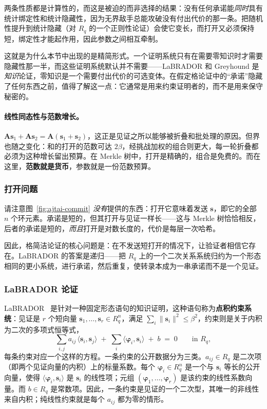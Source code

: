 两条性质都是计算性的，而这是被迫的而非选择的结果：没有任何承诺能\emph{同时}具有统计绑定性和统计隐藏性，因为无界敌手总能攻破没有付出代价的那一条。把随机性提升到统计隐藏（对 $R_q$ 的一个正则性论证）会使它变长，而打开又必须保持短，绑定性才能起作用，因此参数之间相互牵制。

这就是为什么本节中出现的是精简形式。一个证明系统只有在需要零知识时才需要隐藏性那一半，而这些证明系统默认并不需要——LaBRADOR 和 Greyhound 是\emph{知识}论证，零知识是一个需要付出代价的可选变体。在假定格论证中的“承诺”隐藏了任何东西之前，值得了解这一点：它通常是用来约束证明者的，而不是用来保守秘密的。

\paragraph{线性同态性与范数增长。}
$\mathbf{A}\mathbf{s}_1+\mathbf{A}\mathbf{s}_2=\mathbf{A}(\mathbf{s}_1+\mathbf{s}_2)$，这正是见证之所以能够被折叠和批处理的原因。但界也随之变化：和的打开的范数可达 $2\beta$，经挑战加权的组合则更大，每一轮折叠都必须为这种增长留出预算。在 Merkle 树中，打开是精确的，组合是免费的。而在这里，\textbf{范数就是货币}，参数就是一份范数预算。

\subsubsection{打开问题}
请注意图~\ref{fig:ajtai-commit} \emph{没有}提供的东西：打开它意味着发送 $\mathbf{s}$，即它的全部 $n$ 个环元素。承诺是短的，但其打开与见证一样长——这与 Merkle 树恰恰相反，后者的承诺是短的，\emph{而且}打开是对数长度的，代价是每层一次哈希。

因此，格简洁论证的核心问题是：在不发送短打开的情况下，让验证者相信它存在。LaBRADOR 的答案是递归——把 $R_q$ 上的一个二次关系系统归约为一个形态相同的更小系统，进行承诺，然后重复，使转录本成为一串承诺而不是一个见证。

\subsubsection{LaBRADOR 论证}
\label{sec:labrador-outline}
LaBRADOR~\cite{labrador2023} 是针对一种固定形态语句的知识证明，这种语句称为\textbf{点积约束系统}：见证是 $r$ 个短向量 $\mathbf{s}_1,\dots,\mathbf{s}_r\in R_q^{n}$，满足 $\sum_i\|\mathbf{s}_i\|^2\le\beta^2$，约束则是关于内积为二次的多项式恒等式，
\[
  \sum_{i,j} a_{ij}\,\langle \mathbf{s}_i,\mathbf{s}_j\rangle
  \;+\;\sum_i \langle \boldsymbol{\varphi}_i,\mathbf{s}_i\rangle
  \;+\; b \;=\; 0 \qquad\text{in } R_q ,
\]
每条约束对应一个这样的方程。一条约束的公开数据分为三类。$a_{ij}\in R_q$ 是二次项（即两个见证向量的内积）上的标量系数。每个 $\boldsymbol{\varphi}_i\in R_q^{n}$ 是一个与 $\mathbf{s}_i$ 等长的公开向量，使得 $\langle\boldsymbol{\varphi}_i,\mathbf{s}_i\rangle$ 是 $\mathbf{s}_i$ 的线性项；元组 $(\boldsymbol{\varphi}_1,\dots,\boldsymbol{\varphi}_r)$ 是该约束的线性系数向量。而 $b\in R_q$ 是常数项。因此，一条约束是见证的一个二次型，其唯一的非线性来自内积；纯线性约束就是每个 $a_{ij}$ 都为零的情形。

